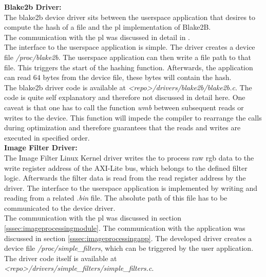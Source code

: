 
\textbf{Blake2b Driver:}\\
The blake2b device driver sits between the userspace application that desires to
compute the hash of a file and the \gls{pl} implementation of Blake2B.\\
The communication with the \gls{pl} was discussed in detail in
.\\
The interface to the userspace application is simple.
The driver creates a device file \emph{/proc/blake2b}.
The userspace application can then write a file path to that file.
This triggers the start of the hashing function.
Afterwards, the application can read $64$ bytes from the device file, these
bytes will contain the hash.\\
The blake2b driver code is available at \emph{<repo>/drivers/blake2b/blake2b.c}.
The code is quite self explanatory and therefore not discussed in detail here.
One caveat is that one has to call the function \emph{wmb} between subsequent
reads or writes to the device.
This function will impede the compiler to rearrange the calls during
optimization and therefore guarantees that the reads and writes are executed in
specified order.
\\
\textbf{Image Filter Driver:}\\
The Image Filter Linux Kernel driver writes the to process raw \gls{rgb} data to the write register address of the AXI-Lite bus, which belongs to the defined filter logic. Afterwards the filter data is read from the read register address by the driver. The interface to the userspace application is implemented by writing and reading from a related \emph{.bin} file. The absolute path of this file has to be communicated to the device driver.\\
The communication with the \gls{pl} was discussed in section \ref{sssec:imageprocessingmodule}. The communication with the application was discussed in section \ref{sssec:imageprocessingapp}. The developed driver creates a device file \emph{/proc/simple_filters}, which can be triggered by the user application. The driver code itself is available at \emph{<repo>/drivers/simple_filters/simple_filters.c}.
